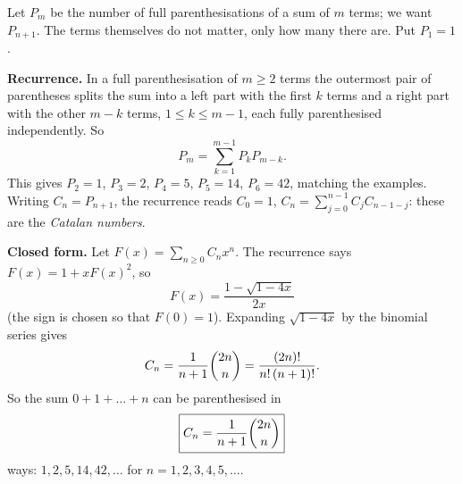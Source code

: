 Let $P_m$ be the number of full parenthesisations of a sum of $m$ terms; we want $P_{n+1}$. The terms themselves do not matter, only how many there are. Put $P_1=1$.

\textbf{Recurrence.} In a full parenthesisation of $m\ge2$ terms the outermost pair of parentheses splits the sum into a left part with the first $k$ terms and a right part with the other $m-k$ terms, $1\le k\le m-1$, each fully parenthesised independently. So
\[
P_m=\sum_{k=1}^{m-1}P_kP_{m-k}.
\]
This gives $P_2=1$, $P_3=2$, $P_4=5$, $P_5=14$, $P_6=42$, matching the examples. Writing $C_n=P_{n+1}$, the recurrence reads $C_0=1$, $C_n=\sum_{j=0}^{n-1}C_jC_{n-1-j}$: these are the \emph{Catalan numbers}.

\textbf{Closed form.} Let $F(x)=\sum_{n\ge0}C_nx^n$. The recurrence says $F(x)=1+xF(x)^2$, so
\[
F(x)=\dfrac{1-\sqrt{1-4x}}{2x}
\]
(the sign is chosen so that $F(0)=1$). Expanding $\sqrt{1-4x}$ by the binomial series gives
\[
C_n=\dfrac{1}{n+1}\dbinom{2n}{n}=\dfrac{(2n)!}{n!\,(n+1)!}.
\]
So the sum $0+1+\dots+n$ can be parenthesised in
\[
\boxed{C_n=\dfrac{1}{n+1}\dbinom{2n}{n}}
\]
ways: $1,2,5,14,42,\dots$ for $n=1,2,3,4,5,\dots$.

